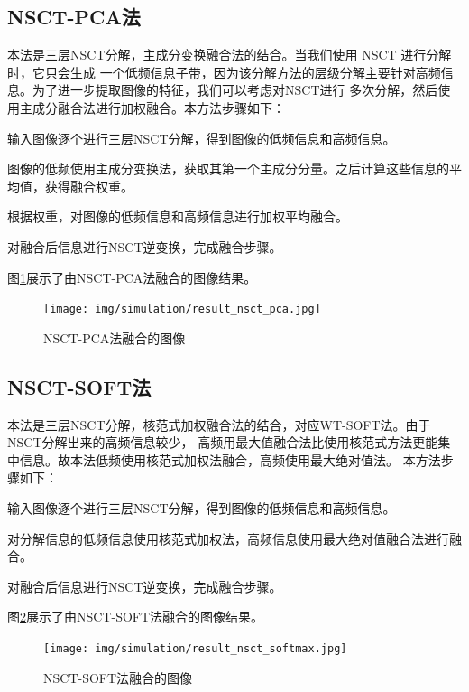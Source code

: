 \documentclass{xduugthesis}
\begin{document}
\subsection{NSCT-PCA法}
本法是三层NSCT分解，主成分变换融合法的结合。当我们使用 NSCT 进行分解时，它只会生成
一个低频信息子带，因为该分解方法的层级分解主要针对高频信息。为了进一步提取图像的特征，我们可以考虑对NSCT进行
多次分解，然后使用主成分融合法进行加权融合。本方法步骤如下：\\
\begin{enumerate*}[itemjoin=\\\hspace*{\parindent}, itemsep=5mm\hspace*{\parindent}]
	\item 输入图像逐个进行三层NSCT分解，得到图像的低频信息和高频信息。
	\item 图像的低频使用主成分变换法，获取其第一个主成分分量。之后计算这些信息的平均值，获得融合权重。
	\item 根据权重，对图像的低频信息和高频信息进行加权平均融合。
	\item 对融合后信息进行NSCT逆变换，完成融合步骤。
\end{enumerate*}\par
图\ref{simulation_nsct_pca}展示了由NSCT-PCA法融合的图像结果。
\begin{figure}[!htb]
	\texttt{[image: img/simulation/result\_nsct\_pca.jpg]}
	\caption{NSCT-PCA法融合的图像}\label{simulation_nsct_pca}
\end{figure}
\subsection{NSCT-SOFT法}
本法是三层NSCT分解，核范式加权融合法的结合，对应WT-SOFT法。由于NSCT分解出来的高频信息较少，
高频用最大值融合法比使用核范式方法更能集中信息。故本法低频使用核范式加权法融合，高频使用最大绝对值法。
本方法步骤如下：\\
\begin{enumerate*}[itemjoin=\\\hspace*{\parindent}, itemsep=5mm\hspace*{\parindent}]
	\item 输入图像逐个进行三层NSCT分解，得到图像的低频信息和高频信息。
	\item 对分解信息的低频信息使用核范式加权法，高频信息使用最大绝对值融合法进行融合。
	\item 对融合后信息进行NSCT逆变换，完成融合步骤。
\end{enumerate*}\par
图\ref{simulation_nsct_softmax}展示了由NSCT-SOFT法融合的图像结果。
\begin{figure}[!htb]
	\texttt{[image: img/simulation/result\_nsct\_softmax.jpg]}
	\caption{NSCT-SOFT法融合的图像}\label{simulation_nsct_softmax}
\end{figure}
\end{document}
